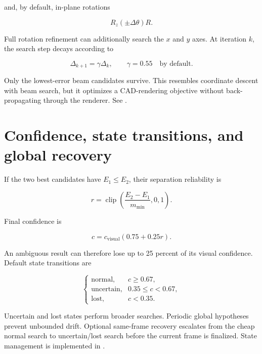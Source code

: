 \documentclass[11pt]{article}
\newcommand{\clip}{\operatorname{clip}}
\begin{document}
and, by default, in-plane rotations

\begin{equation}
R_z(\pm\Delta\theta)R.
\end{equation}

Full rotation refinement can additionally search the $x$ and $y$ axes. At
iteration $k$, the search step decays according to

\begin{equation}
\Delta_{k+1}=\gamma\Delta_k,
\qquad
\gamma=0.55\quad\text{by default}.
\end{equation}

Only the lowest-error beam candidates survive. This resembles coordinate
descent with beam search, but it optimizes a CAD-rendering objective without
back-propagating through the renderer. See .

\section{Confidence, state transitions, and global recovery}

If the two best candidates have $E_1\le E_2$, their separation reliability is

\begin{equation}
r=\clip\left(\frac{E_2-E_1}{m_{\min}},0,1\right).
\end{equation}

Final confidence is

\begin{equation}
c=c_{\mathrm{visual}}(0.75+0.25r).
\end{equation}

An ambiguous result can therefore lose up to 25 percent of its visual
confidence. Default state transitions are

\begin{equation}
\begin{cases}
\text{normal}, & c\ge0.67,\\
\text{uncertain}, & 0.35\le c<0.67,\\
\text{lost}, & c<0.35.
\end{cases}
\end{equation}

Uncertain and lost states perform broader searches. Periodic global
hypotheses prevent unbounded drift. Optional same-frame recovery escalates
from the cheap normal search to uncertain/lost search before the current frame
is finalized. State management is implemented in .
\end{document}
